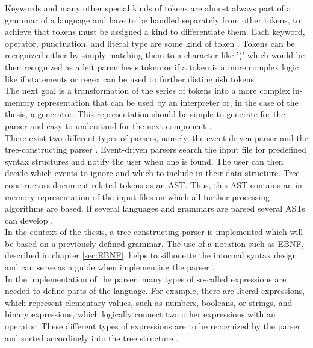 Keywords and many other special kinds of tokens are almost always part of a grammar of a language and have to be handled separately from other tokens, to achieve that tokens must be assigned a kind to differentiate them. Each keyword, operator, punctuation, and literal type are some kind of token \parencite[cf.][p. 43]{nystrom_crafting_2021}. Tokens can be recognized either by simply matching them to a character like '(' which would be then recognized as a left parenthesis token or if a token is a more complex logic like if statements or regex can be used to further distinguish tokens \parencite[see][pp. 47-54]{nystrom_crafting_2021}.\\
The next goal is a transformation of the series of tokens into a more complex in-memory representation that can be used by an interpreter or, in the case of the thesis, a generator. This representation should be simple to generate for the parser and easy to understand for the next component \parencite[cf.][p. 59]{nystrom_crafting_2021}.\\
There exist two different types of parsers, namely, the event-driven parser and the tree-constructing parser \parencite[cf.][p. 5]{sarkar_code_2001}. Event-driven parsers search the input file for predefined syntax structures and notify the user when one is found. The user can then decide which events to ignore and which to include in their data structure. Tree constructors document related tokens as an \ac{AST}. Thus, this \ac{AST} contains an in-memory representation of the input files on which all further processing algorithms are based. If several languages and grammars are parsed several \ac{AST}s can develop \parencite[cf.][pp. 5-6]{sarkar_code_2001}.\\
In the context of the thesis, a tree-constructing parser is implemented which will be based on a previously defined grammar. The use of a notation such as \ac{EBNF}, described in chapter \ref{sec:EBNF}, helps to silhouette the informal syntax design and can serve as a guide when implementing the parser \parencite[cf.][p. 64]{nystrom_crafting_2021}.\\
In the implementation of the parser, many types of so-called expressions are needed to define parts of the language. For example, there are literal expressions, which represent elementary values, such as numbers, booleans, or strings, and binary expressions, which logically connect two other expressions with an operator. These different types of expressions are to be recognized by the parser and sorted accordingly into the tree structure \parencite[see][pp. 64-68]{nystrom_crafting_2021}.\\

